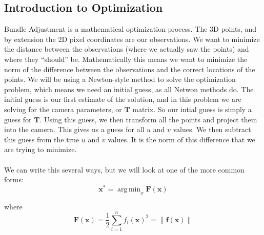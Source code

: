 \documentclass{article}
\DeclareMathOperator*{\argmin}{arg\,min}
\begin{document}
\subsection{Introduction to Optimization}
\label{sec:optimization-intro}
Bundle Adjustment is a mathematical optimization process.  The 3D
points, and by extension the 2D pixel coordinates are our
observations.  We want to minimize the distance between the
observations (where we actually saw the points) and where they
``should'' be.  Mathematically this means we want to minimize the norm
of the difference between the observations and the correct locations
of the points.  We will be using a Newton-style method to solve the
optimization problem, which means we need an initial guess, as all
Netwon methods do.  The initial guess is our first estimate of the
solution, and in this problem we are solving for the camera
parameters, or $\mathbf{T}$ matrix.  So our intial guess is simply a
guess for $\mathbf{T}$.  Using this guess, we then transform all the
points and project them into the camera.  This gives us a guess for
all $u$ and $v$ values.  We then subtract this guess from the true $u$
and $v$ values.  It is the norm of this difference that we are trying
to minimize.
\\
\\
We can write this several ways, but we will look at one of the more
common forms:
\begin{equation}
  \label{eq:argmin}
  \mathbf{x^*} = \argmin_x \mathbf{F}(\mathbf{x})
\end{equation}

where
\begin{equation}
  \label{eq:argmin-F}
  \mathbf{F}(\mathbf{x}) = \frac{1}{2} \sum\limits_{i=1}^n f_i(\mathbf{x})^2 = \| \mathbf{f}(\mathbf{x}) \|
\end{equation}
\end{document}
